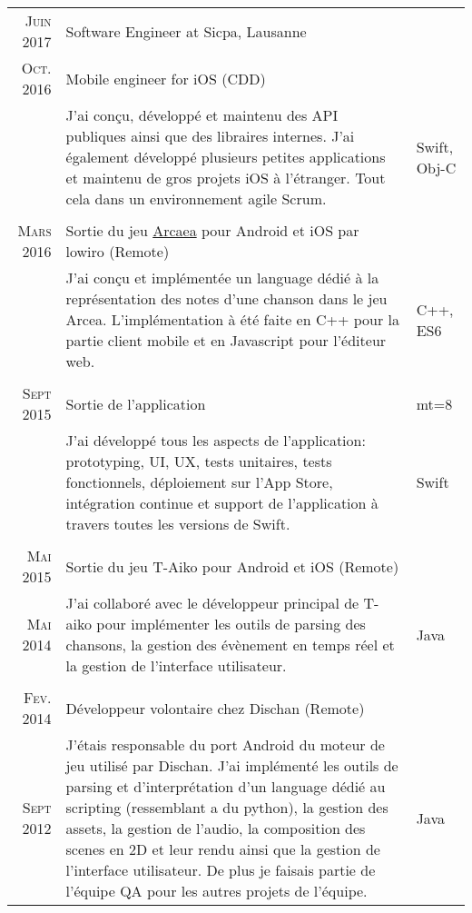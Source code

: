 \documentclass[a4paper,10pt]{article} %
\begin{document}
\begin{tabular}{r|p{9.3cm}|l}
\textsc{Juin 2017} & Software Engineer at Sicpa, Lausanne\\
\textsc{Oct. 2016} & Mobile engineer for iOS (CDD)\\ 
& \footnotesize{J'ai conçu, développé et maintenu des API publiques ainsi que des libraires internes. J'ai également développé plusieurs petites applications et maintenu de gros projets iOS à l'étranger. Tout cela dans un environnement agile Scrum.} & Swift, Obj-C\\
\\
\textsc{Mars 2016}  & Sortie du jeu \href{https://arcaea.lowiro.com}{Arcaea} pour Android et iOS par lowiro (Remote)& \\
& \footnotesize{J'ai conçu et implémentée un language dédié à la représentation des notes d'une chanson dans le jeu Arcea. L'implémentation à été faite en C++ pour la partie client mobile et en Javascript pour l'éditeur web.} & C++, ES6\\
\\
\textsc{Sept 2015} & Sortie de l'application \href{https://itunes.apple.com/us/app/hackerspaces/id1035583993?ls=1&mt=8}{Hackerspaces} pour iOS &\\
& \footnotesize{J'ai développé tous les aspects de l'application: prototyping, UI, UX, tests unitaires, tests fonctionnels, déploiement sur l'App Store, intégration continue et support de l'application à travers toutes les versions de Swift.} & Swift\\
\\
\textsc{Mai 2015} & Sortie du jeu T-Aiko pour Android et iOS (Remote) & \\
\textsc{Mai 2014} & \footnotesize{J'ai collaboré avec le développeur principal de T-aiko pour implémenter les outils de parsing des chansons, la gestion des évènement en temps réel et la gestion de l'interface utilisateur.} & Java\\
\\
\textsc{Fev. 2014} & Développeur volontaire chez Dischan (Remote)\\
\textsc{Sept 2012} & \footnotesize{J'étais responsable du port Android du moteur de jeu utilisé par Dischan. J'ai implémenté les outils de parsing et d'interprétation d'un language dédié au scripting (ressemblant a du python), la gestion des assets, la gestion de l'audio, la composition des scenes en 2D et leur rendu ainsi que la gestion de l'interface utilisateur. De plus je faisais partie de l'équipe QA pour les autres projets de l'équipe.} & Java
\end{tabular}
\end{document}
